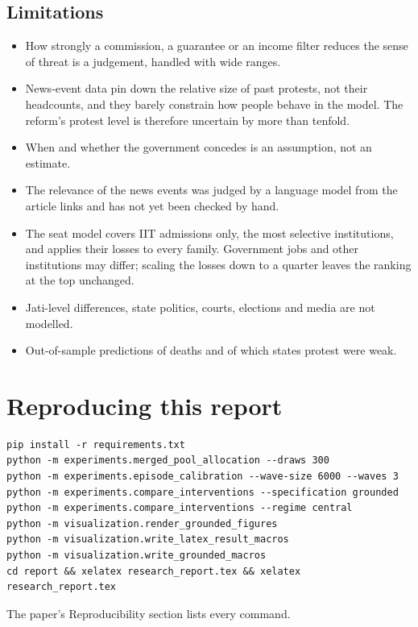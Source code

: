 \documentclass[11pt,a4paper]{article}
\begin{document}
\subsection{Limitations}
\begin{itemize}
\item How strongly a commission, a guarantee or an income filter reduces the sense of threat is a judgement, handled with wide ranges.
\item News-event data pin down the relative size of past protests, not their headcounts, and they barely constrain how people behave in the model. The reform's protest level is therefore uncertain by more than tenfold.
\item When and whether the government concedes is an assumption, not an estimate.
\item The relevance of the news events was judged by a language model from the article links and has not yet been checked by hand.
\item The seat model covers IIT admissions only, the most selective institutions, and applies their losses to every family. Government jobs and other institutions may differ; scaling the losses down to a quarter leaves the ranking at the top unchanged.
\item Jati-level differences, state politics, courts, elections and media are not modelled.
\item Out-of-sample predictions of deaths and of which states protest were weak.
\end{itemize}

\section{Reproducing this report}
\begin{verbatim}
pip install -r requirements.txt
python -m experiments.merged_pool_allocation --draws 300
python -m experiments.episode_calibration --wave-size 6000 --waves 3
python -m experiments.compare_interventions --specification grounded
python -m experiments.compare_interventions --regime central
python -m visualization.render_grounded_figures
python -m visualization.write_latex_result_macros
python -m visualization.write_grounded_macros
cd report && xelatex research_report.tex && xelatex research_report.tex
\end{verbatim}
The paper's Reproducibility section lists every command.
\end{document}
